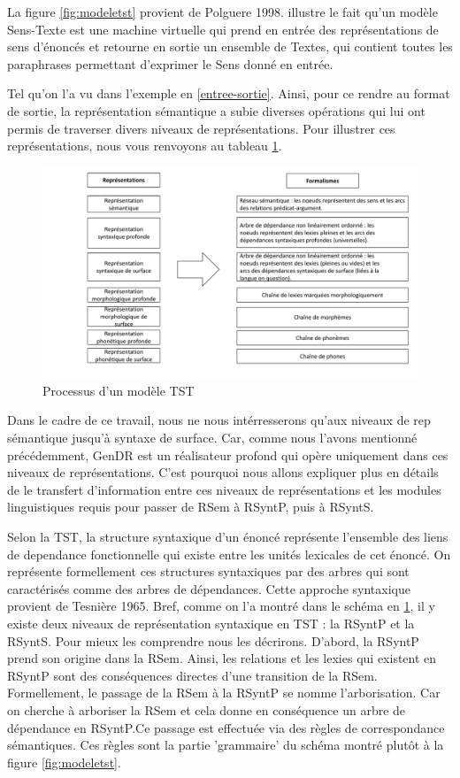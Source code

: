La figure \ref{fig:modeletst} provient de Polguere 1998. illustre le fait qu'un modèle Sens-Texte est une machine virtuelle qui prend en entrée des représentations de sens d'énoncés et retourne en sortie un ensemble de Textes, qui contient toutes les paraphrases permettant d'exprimer le Sens donné en entrée. 

Tel qu'on l'a vu dans l'exemple en \ref{entree-sortie}. Ainsi, pour ce rendre au format de sortie, la représentation sémantique a subie diverses opérations qui lui ont permis de traverser divers niveaux de représentations. Pour illustrer ces représentations, nous vous renvoyons au tableau \ref{fig:processustst}.

\begin{figure}[htb]
	\centering
	\includegraphics[width=1\textwidth, trim = {0cm 0cm 0cm 0cm},clip]{ch3/figs/polguere2.pdf}
	\caption{Processus d'un modèle TST}
	\label{fig:processustst}
\end{figure}

Dans le cadre de ce travail, nous ne nous intérresserons qu'aux niveaux de rep sémantique jusqu'à syntaxe de surface. Car, comme nous l'avons mentionné précédemment, GenDR est un réalisateur profond qui opère uniquement dans ces niveaux de représentations. C'est pourquoi nous allons expliquer plus en détails de le transfert d'information entre ces niveaux de représentations et les modules linguistiques requis pour passer de RSem à RSyntP, puis à RSyntS.

Selon la TST, la structure syntaxique d'un énoncé représente l'ensemble des liens de dependance fonctionnelle qui existe entre les unités lexicales de cet énoncé. On représente formellement ces structures syntaxiques par des arbres qui sont caractérisés comme des arbres de dépendances. Cette approche syntaxique provient de Tesnière 1965. Bref, comme on l'a montré dans le schéma en \ref{fig:processustst}, il y existe deux niveaux de représentation syntaxique en TST : la RSyntP et la RSyntS. Pour mieux les comprendre nous les décrirons. D'abord, la RSyntP prend son origine dans la RSem. Ainsi, les relations et les lexies qui existent en RSyntP sont des conséquences directes d'une transition de la RSem. Formellement, le passage de la RSem à la RSyntP se nomme l'arborisation. Car on cherche à arboriser la RSem et cela donne en conséquence un arbre de dépendance en RSyntP.Ce passage est effectuée via des règles de correspondance sémantiques. Ces règles sont la partie 'grammaire' du schéma montré plutôt à la figure \ref{fig:modeletst}.

